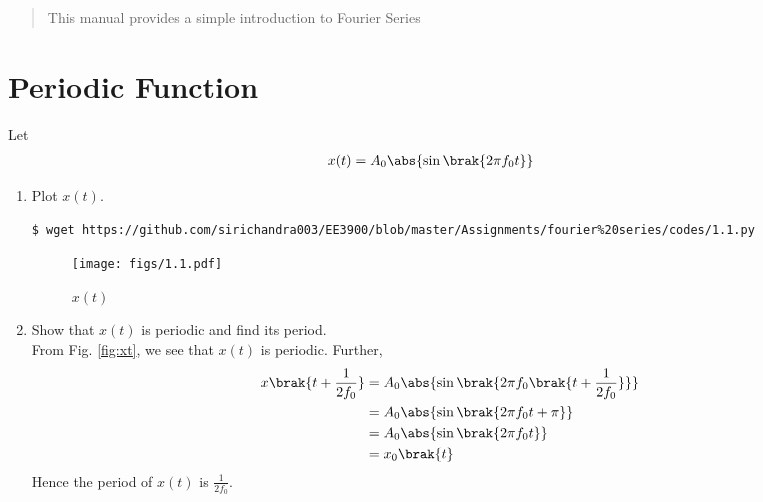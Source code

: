 \documentclass[journal,12pt,twocolumn]{IEEEtran}
\renewcommand\thesection{\arabic{section}}
\begin{document}
% 
\maketitle
\tableofcontents
\renewcommand{\thefigure}{\theenumi}
\renewcommand{\thetable}{\theenumi}
\bigskip
\begin{abstract}
This manual provides a simple introduction to Fourier Series
\end{abstract}
\section{Periodic Function}
Let
\begin{align}
x(t) &= A_0\abs{\sin\brak{2\pi f_0 t}}
\label{eq:10-orig-diff-def}
\end{align}
\begin{enumerate}[label=\thesection.\arabic*
,ref=\thesection.\theenumi]
\item Plot $x(t)$.
\\
\solution
\begin{lstlisting}
$ wget https://github.com/sirichandra003/EE3900/blob/master/Assignments/fourier%20series/codes/1.1.py
\end{lstlisting}
\begin{figure}[!ht]
\texttt{[image: figs/1.1.pdf]}
\caption{$x(t)$}
\label{fig:xt}
\end{figure}
\item Show that $x(t)$ is periodic and find its period. \\
\solution From Fig. \eqref{fig:xt}, we see that $x(t)$ is periodic. Further,
\begin{align}
x\brak{t+\frac{1}{2f_0}} &= A_0\abs{\sin\brak{2\pi f_0\brak{t + \frac{1}{2f_0}}}} \\
&= A_0\abs{\sin\brak{2\pi f_0t + \pi}} \\
&= A_0\abs{\sin\brak{2\pi f_0t}} \\
&= x_0\brak{t}
\end{align}
Hence the period of $x(t)$ is $\frac{1}{2f_0}$.
\end{enumerate}
\end{document}
